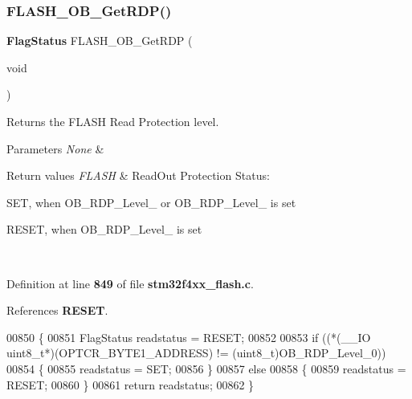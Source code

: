 \subsubsection{F\+L\+A\+S\+H\+\_\+\+O\+B\+\_\+\+Get\+R\+D\+P()}
{\footnotesize\ttfamily \textbf{ Flag\+Status} F\+L\+A\+S\+H\+\_\+\+O\+B\+\_\+\+Get\+R\+DP (\begin{DoxyParamCaption}\item[{void}]{ }\end{DoxyParamCaption})}



Returns the F\+L\+A\+SH Read Protection level. 


\begin{DoxyParams}{Parameters}
{\em None} & \\
\hline
\end{DoxyParams}

\begin{DoxyRetVals}{Return values}
{\em F\+L\+A\+SH} & Read\+Out Protection Status\+:
\begin{DoxyItemize}
\item S\+ET, when O\+B\+\_\+\+R\+D\+P\+\_\+\+Level\+\_ or O\+B\+\_\+\+R\+D\+P\+\_\+\+Level\+\_ is set
\item R\+E\+S\+ET, when O\+B\+\_\+\+R\+D\+P\+\_\+\+Level\+\_ is set 
\end{DoxyItemize}\\
\hline
\end{DoxyRetVals}


Definition at line \textbf{ 849} of file \textbf{ stm32f4xx\+\_\+flash.\+c}.



References \textbf{ R\+E\+S\+ET}.


\begin{DoxyCode}
00850 \{
00851   FlagStatus readstatus = RESET;
00852 
00853   \textcolor{keywordflow}{if} ((*(\_\_IO uint8\_t*)(OPTCR_BYTE1_ADDRESS) != (uint8\_t)OB_RDP_Level_0))
00854   \{
00855     readstatus = SET;
00856   \}
00857   \textcolor{keywordflow}{else}
00858   \{
00859     readstatus = RESET;
00860   \}
00861   \textcolor{keywordflow}{return} readstatus;
00862 \}
\end{DoxyCode}
\mbox{\label{group__FLASH__Group3_ga737dd808489113af7f8df7f7e9f7baae}} 
